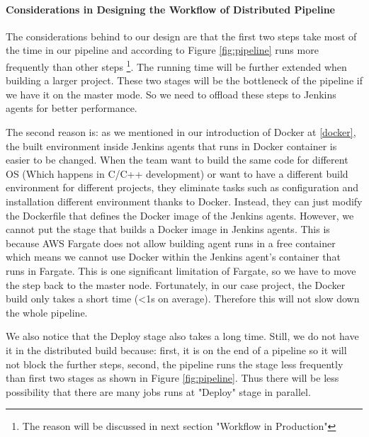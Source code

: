 \paragraph[]{Considerations in Designing the Workflow of Distributed Pipeline}
The considerations behind to our design are that the first two steps take most of the time in our pipeline and according to Figure \ref{fig:pipeline} runs more frequently than other steps \footnote{The reason will be discussed in next section "Workflow in Production"}. The running time will be further extended when building a larger project. These two stages will be the bottleneck of the pipeline if we have it on the master mode. So we need to offload these steps to Jenkins agents for better performance.
\par
The second reason is: as we mentioned in our introduction of Docker at \ref{docker}, the built environment inside Jenkins agents that runs in Docker container is easier to be changed. When the team want to build the same code for different OS (Which happens in C/C++ development) or want to have a different build environment for different projects, they eliminate tasks such as configuration and installation different environment thanks to Docker. Instead, they can just modify the Dockerfile that defines the Docker image of the Jenkins agents. However, we cannot put the stage that builds a Docker image in Jenkins agents. This is because AWS Fargate does not allow building agent runs in a free container which means we cannot use Docker within the Jenkins agent's container that runs in Fargate. This is one significant limitation of Fargate, so we have to move the step back to the master node. Fortunately, in our case project, the Docker build only takes a short time (<1s on average). Therefore this will not slow down the whole pipeline.
\par
We also notice that the Deploy stage also takes a long time. Still, we do not have it in the distributed build because: first, it is on the end of a pipeline so it will not block the further steps, second, the pipeline runs the stage less frequently than first two stages as shown in Figure \ref{fig:pipeline}. Thus there will be less possibility that there are many jobs runs at "Deploy" stage in parallel.
